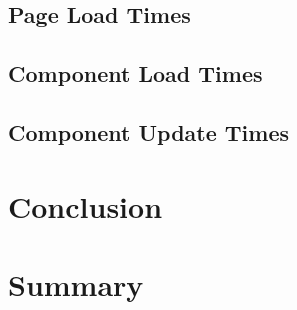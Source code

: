\documentclass[a4paper, fontsize=11pt]{article}
\begin{document}
\subsection{Page Load Times}\label{subsec:pageloadtimes}

\subsection{Component Load Times}\label{subsec:componentloadtimes}

\subsection{Component Update Times}\label{subsec:componentupdatetimes}

\section{Conclusion}\label{sec:conclusion}

\section{Summary}\label{sec:summary}

\pagebreak



\nocite{*}
{}
\end{document}
